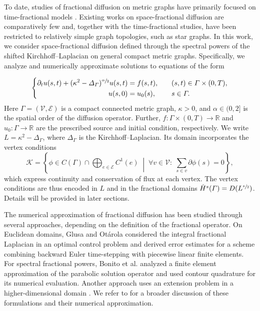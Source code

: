 \documentclass[numbers,webpdf]{ima-authoring-template}%
\theoremstyle{thmstyletwo}%
\numberwithin{equation}{section}
\begin{document}
To date, studies of fractional diffusion on metric graphs have primarily focused on time-fractional models \cite{Faheem2023Acollocation, Kumari2025Finite, Mehandiratta2021Optimalcontrol}. Existing works on space-fractional diffusion are comparatively few \cite{Leugering2023Optimalcontrol} and, together with the time-fractional studies, have been restricted to relatively simple graph topologies, such as star graphs. In this work, we consider space-fractional diffusion defined through the spectral powers of the shifted Kirchhoff--Laplacian on general compact metric graphs. Specifically, we analyze and numerically approximate solutions to equations of the form

\begin{equation}
\label{eq:maineq}
\left\{
\begin{aligned}
    \partial_t u(s,t) + (\kappa^2 - {\mit\varDelta}_{\mit\varGamma})^{\sfrac{\alpha}{2}} u(s,t) &= f(s,t), && \quad (s,t) \in {\mit\varGamma} \times (0, T), \\
    u(s,0) &= u_0(s), && \quad s \in {\mit\varGamma}.
\end{aligned}
\right.
\end{equation}
Here $\Gamma=(\mathcal{V},\mathcal{E})$ is a compact connected metric graph, $\kappa>0$, and $\alpha\in(0,2]$ is the spatial order of the diffusion operator. Further, $f:\Gamma\times(0,T)\to\mathbb{R}$ and $u_0:\Gamma\to\mathbb{R}$ are the prescribed source and initial condition, respectively. We write $L=\kappa^2-\Delta_\Gamma$, where $\Delta_\Gamma$ is the Kirchhoff--Laplacian. Its domain incorporates the vertex conditions
\begin{equation}
\label{eq:Kcond}
   \mathcal{K} =  \left\{\phi\in C(\Gamma)\cap \textstyle\bigoplus_{e\in\mathcal{E}} C^{1}(e)\;\middle|\; \forall v\in \mathcal{V}:\; \textstyle\sum_{s\in v}\partial \phi(s)=0 \right\},
\end{equation}
which express continuity and conservation of flux at each vertex. The vertex conditions are thus encoded in $L$ and in the fractional domains $\dot{H}^{s}({\mit\varGamma})=D(L^{\sfrac{s}{2}})$. Details will be provided in later sections.

The numerical approximation of fractional diffusion has been studied through several approaches, depending on the definition of the fractional operator. On Euclidean domains, Glusa and Otárola \cite{Glusa2021errorestimates} considered the integral fractional Laplacian in an optimal control problem and derived error estimates for a scheme combining backward Euler time-stepping with piecewise linear finite elements. For spectral fractional powers, Bonito et al. \cite{Bonito2017Theapproximation} analyzed a finite element approximation of the parabolic solution operator and used contour quadrature for its numerical evaluation. Another approach uses an extension problem in a higher-dimensional domain \cite{Nochetto2016APDEapproach}. We refer to \cite{Bonito2018Numericalmethods} for a broader discussion of these formulations and their numerical approximation.
\end{document}
